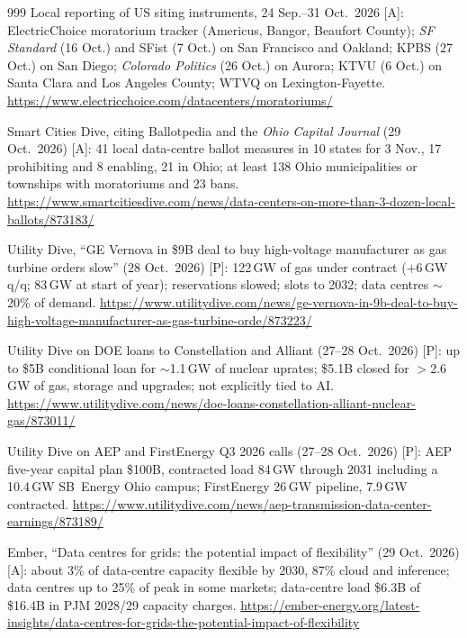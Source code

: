 \begin{thebibliography}{999}
 Local reporting of US siting instruments, 24 Sep.--31 Oct.\ 2026 [A]: ElectricChoice moratorium tracker (Americus, Bangor, Beaufort County); \emph{SF Standard} (16 Oct.) and SFist (7 Oct.) on San Francisco and Oakland; KPBS (27 Oct.) on San Diego; \emph{Colorado Politics} (26 Oct.) on Aurora; KTVU (6 Oct.) on Santa Clara and Los Angeles County; WTVQ on Lexington-Fayette. \url{https://www.electricchoice.com/datacenters/moratoriums/}

 Smart Cities Dive, citing Ballotpedia and the \emph{Ohio Capital Journal} (29 Oct.\ 2026) [A]: 41 local data-centre ballot measures in 10 states for 3 Nov., 17 prohibiting and 8 enabling, 21 in Ohio; at least 138 Ohio municipalities or townships with moratoriums and 23 bans. \url{https://www.smartcitiesdive.com/news/data-centers-on-more-than-3-dozen-local-ballots/873183/}

 Utility Dive, ``GE Vernova in \$9B deal to buy high-voltage manufacturer as gas turbine orders slow'' (28 Oct.\ 2026) [P]: 122\,GW of gas under contract ($+$6\,GW q/q; 83\,GW at start of year); reservations slowed; slots to 2032; data centres $\sim$20\% of demand. \url{https://www.utilitydive.com/news/ge-vernova-in-9b-deal-to-buy-high-voltage-manufacturer-as-gas-turbine-orde/873223/}

 Utility Dive on DOE loans to Constellation and Alliant (27--28 Oct.\ 2026) [P]: up to \$5B conditional loan for $\sim$1.1\,GW of nuclear uprates; \$5.1B closed for $>$2.6\,GW of gas, storage and upgrades; not explicitly tied to AI. \url{https://www.utilitydive.com/news/doe-loans-constellation-alliant-nuclear-gas/873011/}

 Utility Dive on AEP and FirstEnergy Q3 2026 calls (27--28 Oct.\ 2026) [P]: AEP five-year capital plan \$100B, contracted load 84\,GW through 2031 including a 10.4\,GW SB~Energy Ohio campus; FirstEnergy 26\,GW pipeline, 7.9\,GW contracted. \url{https://www.utilitydive.com/news/aep-transmission-data-center-earnings/873189/}

 Ember, ``Data centres for grids: the potential impact of flexibility'' (29 Oct.\ 2026) [A]: about 3\% of data-centre capacity flexible by 2030, 87\% cloud and inference; data centres up to 25\% of peak in some markets; data-centre load \$6.3B of \$16.4B in PJM 2028/29 capacity charges. \url{https://ember-energy.org/latest-insights/data-centres-for-grids-the-potential-impact-of-flexibility}


\end{thebibliography}
